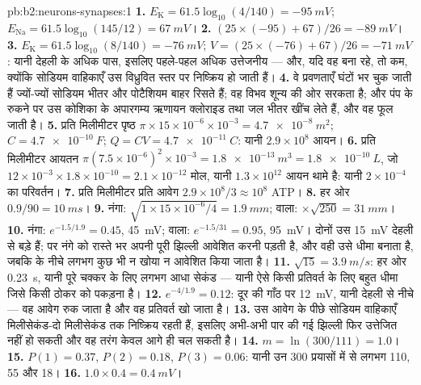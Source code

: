 \begin{solution}{pb:b2:neurons-synapses:1}
\textbf{1.} $E_{\mathrm K} = 61.5\log_{10}(4/140) = \qty{-95}{mV}$;
$E_{\mathrm{Na}} = 61.5\log_{10}(145/12) = \qty{+67}{mV}$।
\textbf{2.} $(25\times(-95) + 67)/26 = \qty{-89}{mV}$।
\textbf{3.} $E_{\mathrm K} = 61.5\log_{10}(8/140) = \qty{-76}{mV}$;
$V = (25\times(-76) + 67)/26 = \qty{-71}{mV}$: यानी देहली के अधिक पास,
इसलिए पहले-पहल अधिक उत्तेजनीय --- और, यदि वह बना रहे, तो कम, क्योंकि सोडियम
वाहिकाएँ उस विध्रुवित स्तर पर निष्क्रिय हो जाती हैं।
\textbf{4.} वे प्रवणताएँ घंटों भर चुक जाती हैं ज्यों-ज्यों सोडियम भीतर और
पोटैशियम बाहर रिसते हैं; वह विभव शून्य की ओर सरकता है; और पंप के
रुकने पर उस कोशिका के अपारगम्य ऋणायन क्लोराइड तथा जल भीतर खींच लेते हैं,
और वह फूल जाती है।
\textbf{5.} प्रति मिलीमीटर पृष्ठ $\pi\times 15\times 10^{-6}\times
10^{-3} = \qty{4.7e-8}{m^2}$; $C = \qty{4.7e-10}{F}$; $Q = CV =
\qty{4.7e-11}{C}$: यानी $2.9\times 10^{8}$ आयन।
\textbf{6.} प्रति मिलीमीटर आयतन $\pi(7.5\times 10^{-6})^{2}\times
10^{-3} = \qty{1.8e-13}{m^3} = \qty{1.8e-10}{L}$, जो $12\times
10^{-3}\times 1.8\times 10^{-10} = 2.1\times 10^{-12}$ मोल, यानी $1.3\times
10^{12}$ आयन थामे है: यानी $2\times 10^{-4}$ का परिवर्तन।
\textbf{7.} प्रति मिलीमीटर प्रति आवेग $2.9\times 10^{8}/3 \approx 10^{8}$
ATP।
\textbf{8.} हर ओर $0.9/90 = \qty{10}{ms}$।
\textbf{9.} नंगा: $\sqrt{1\times 15\times 10^{-6}/4} = \qty{1.9}{mm}$;
 वाला: $\times\sqrt{250} = \qty{31}{mm}$।
\textbf{10.} नंगा: $e^{-1.5/1.9} = 0.45$, \qty{45}{mV};  वाला:
$e^{-1.5/31} = 0.95$, \qty{95}{mV}। दोनों उस \qty{15}{mV}
देहली से बड़े हैं; पर नंगे  को रास्ते भर अपनी पूरी झिल्ली
आवेशित करनी पड़ती है, और वही उसे धीमा बनाता है, जबकि  के नीचे लगभग
कुछ भी न खोया न आवेशित किया जाता है।
\textbf{11.} $\sqrt{15} = \qty{3.9}{m/s}$: हर ओर \qty{0.23}{s},
यानी पूरे चक्कर के लिए लगभग आधा सेकंड --- यानी ऐसे किसी प्रतिवर्त के लिए बहुत धीमा
जिसे किसी ठोकर को पकड़ना है।
\textbf{12.} $e^{-4/1.9} = 0.12$: दूर की गाँठ पर \qty{12}{mV}, यानी देहली से
नीचे --- वह आवेग रुक जाता है और वह प्रतिवर्त खो जाता है।
\textbf{13.} उस आवेग के पीछे सोडियम वाहिकाएँ मिलीसेकंड-दो मिलीसेकंड तक
निष्क्रिय रहती हैं, इसलिए अभी-अभी पार की गई झिल्ली फिर उत्तेजित नहीं हो
सकती और वह तरंग केवल आगे ही चल सकती है।
\textbf{14.} $m = \ln(300/111) = 1.0$।
\textbf{15.} $P(1) = 0.37$, $P(2) = 0.18$, $P(3) = 0.06$: यानी उन 300
प्रयासों में से लगभग 110, 55 और 18।
\textbf{16.} $1.0\times 0.4 = \qty{0.4}{mV}$।

\end{solution}
